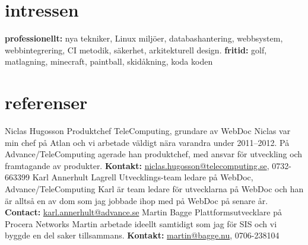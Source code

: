 \documentclass[]{friggeri-cv} %
\begin{document}

\section{intressen}

\textbf{professionellt:} nya tekniker, Linux miljöer, databashantering, webbsystem, webbintegrering, CI metodik, säkerhet, arkitekturell design. \textbf{fritid:} golf, matlagning, minecraft, paintball, skidåkning, koda koden


\section{referenser}
\begin{entrylist}
	\entry
	{}
	{Niclas Hugosson}
	{Produktchef TeleComputing, grundare av WebDoc}
	{Niclas var min chef på Atlan och vi arbetade väldigt nära varandra under 2011--2012. På Advance/TeleComputing agerade han produktchef, med ansvar för utveckling och framtagande av produkter. \textbf{Kontakt:} \href{mailto:niclas.hugosson@telecomputing.se}{niclas.hugosson@telecomputing.se}, 0732-663399}
	\entry
    {}
    {Karl Annerhult Lagrell}
    {Utvecklings-team ledare på WebDoc, Advance/TeleComputing}
    {Karl är team ledare för utvecklarna på WebDoc och han är alltså en av dom som jag jobbade ihop med på WebDoc på senare år. \textbf{Contact:} \href{mailto:karl.annerhult@advance.se}{karl.annerhult@advance.se}}
	\entry
	{}
	{Martin Bagge}
	{Plattformsutvecklare på Procera Networks}
	{Martin arbetade ideellt samtidigt som jag för SIS och vi byggde en del saker tillsammans. \textbf{Kontakt:} \href{mailto:martin@bagge.nu}{martin@bagge.nu}, 0706-238104 }
\end{entrylist}


\end{document}
